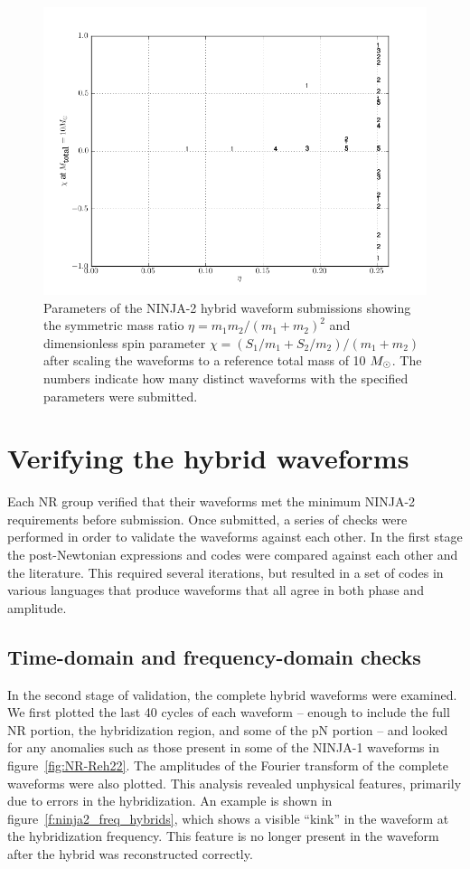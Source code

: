 \begin{figure}
  \includegraphics[width=\linewidth]{figures/ninja2/ninja2_cat.png}
  \caption[Parameters of the NINJA-2 submissions]{
  \label{f:ninja2_param_map}
Parameters of the NINJA-2 hybrid waveform submissions showing the
symmetric mass ratio $\eta=m_1 m_2 /(m_1+m_2)^2$ and dimensionless
spin parameter $\chi=(S_1/m_1 + S_2/m_2)/(m_1+m_2)$ after scaling the
waveforms to a reference total mass of 10 $M_\odot$.  The numbers indicate 
how many distinct waveforms with the specified parameters were submitted.}
\end{figure}%

\section{Verifying the hybrid waveforms}

Each NR group verified that their waveforms met the minimum NINJA-2
requirements before submission.  Once submitted, a series of checks
were performed in order to validate the waveforms against each other.
In the first stage the post-Newtonian expressions and codes were
compared against each other and the literature.  This required several
iterations, but resulted in a set of codes in various languages that
produce waveforms that all agree in both phase and amplitude. 

\subsection{Time-domain and frequency-domain checks}

In the second stage of validation, the complete hybrid waveforms were
examined.  We first plotted the last 40 cycles of each waveform --
enough to include the full NR portion, the hybridization region, and
some of the pN portion -- and looked for any anomalies such as those
present in some of the NINJA-1 waveforms in figure~\ref{fig:NR-Reh22}.
The amplitudes of the Fourier transform of the complete waveforms were
also plotted.  This analysis revealed unphysical features, primarily
due to errors in the hybridization.  An example is shown in
figure~\ref{f:ninja2_freq_hybrids}, which shows a visible ``kink'' in
the waveform at the hybridization frequency.  This feature is no
longer present in the waveform after the hybrid was reconstructed
correctly.

